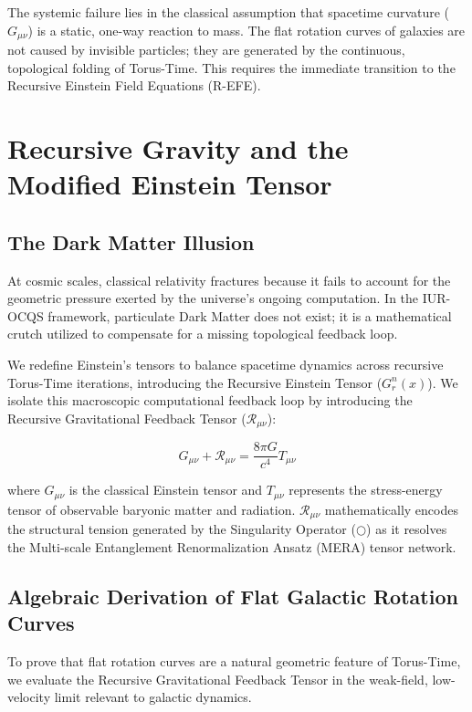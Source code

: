 \documentclass[12pt,openany]{book}
\begin{document}
The systemic failure lies in the classical assumption that spacetime curvature ($G_{\mu\nu}$) is a static, one-way reaction to mass. The flat rotation curves of galaxies are not caused by invisible particles; they are generated by the continuous, topological folding of Torus-Time. This requires the immediate transition to the Recursive Einstein Field Equations (R-EFE).

\chapter[Recursive Gravity]{Recursive Gravity and the Modified Einstein Tensor}

\section{The Dark Matter Illusion}
At cosmic scales, classical relativity fractures because it fails to account for the geometric pressure exerted by the universe's ongoing computation. In the IUR-OCQS framework, particulate Dark Matter does not exist; it is a mathematical crutch utilized to compensate for a missing topological feedback loop.

We redefine Einstein's tensors to balance spacetime dynamics across recursive Torus-Time iterations, introducing the Recursive Einstein Tensor ($G_r^n(x)$). We isolate this macroscopic computational feedback loop by introducing the Recursive Gravitational Feedback Tensor ($\mathcal{R}_{\mu\nu}$):

\begin{equation}
G_{\mu\nu} + \mathcal{R}_{\mu\nu} = \frac{8\pi G}{c^4} T_{\mu\nu}
\end{equation}

where $G_{\mu\nu}$ is the classical Einstein tensor and $T_{\mu\nu}$ represents the stress-energy tensor of observable baryonic matter and radiation. $\mathcal{R}_{\mu\nu}$ mathematically encodes the structural tension generated by the Singularity Operator ($\bigcirc$) as it resolves the Multi-scale Entanglement Renormalization Ansatz (MERA) tensor network.

\section{Algebraic Derivation of Flat Galactic Rotation Curves}
To prove that flat rotation curves are a natural geometric feature of Torus-Time, we evaluate the Recursive Gravitational Feedback Tensor in the weak-field, low-velocity limit relevant to galactic dynamics.
\end{document}
